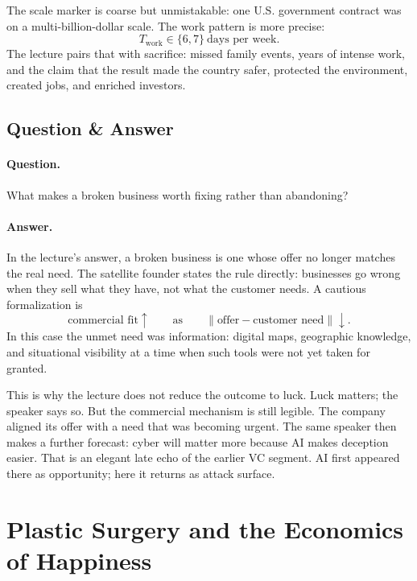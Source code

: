The scale marker is coarse but unmistakable: one U.S. government contract was on a multi-billion-dollar scale. The work pattern is more precise:
\begin{equation}
T_{\text{work}} \in \{6,7\} \ \text{days per week}.
\end{equation}
The lecture pairs that with sacrifice: missed family events, years of intense work, and the claim that the result made the country safer, protected the environment, created jobs, and enriched investors.

\subsection{Question \& Answer}

\paragraph{Question.} What makes a broken business worth fixing rather than abandoning?

\paragraph{Answer.} In the lecture's answer, a broken business is one whose offer no longer matches the real need. The satellite founder states the rule directly: businesses go wrong when they sell what they have, not what the customer needs. A cautious formalization is
\begin{equation}
\text{commercial fit} \uparrow
\qquad \text{as} \qquad
\|\text{offer} - \text{customer need}\| \downarrow.
\end{equation}
In this case the unmet need was information: digital maps, geographic knowledge, and situational visibility at a time when such tools were not yet taken for granted.

This is why the lecture does not reduce the outcome to luck. Luck matters; the speaker says so. But the commercial mechanism is still legible. The company aligned its offer with a need that was becoming urgent. The same speaker then makes a further forecast: cyber will matter more because AI makes deception easier. That is an elegant late echo of the earlier VC segment. AI first appeared there as opportunity; here it returns as attack surface.

\section{Plastic Surgery and the Economics of Happiness}

